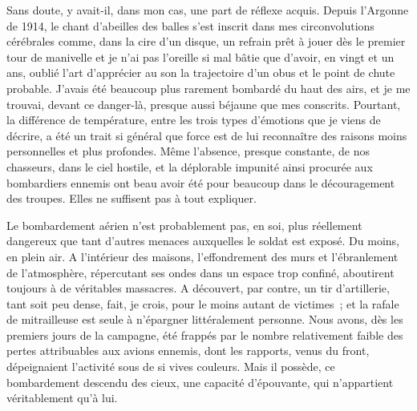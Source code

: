 \documentclass[french,twoside]{book} %
\begin{document}
Sans doute, y avait-il, dans mon cas, une part de réflexe acquis. Depuis l’Argonne de 1914, le chant d’abeilles des balles s’est inscrit dans mes circonvolutions cérébrales comme, dans la cire d’un disque, un refrain prêt à jouer dès le premier tour de manivelle et je n’ai pas l’oreille si mal bâtie que d’avoir, en vingt et un ans, oublié l’art d’apprécier au son la trajectoire d’un obus et le point de chute probable. J’avais été beaucoup plus rarement bombardé du haut des airs, et je me trouvai, devant ce danger-là, presque aussi béjaune que mes conscrits. Pourtant, la différence de température, entre les trois types d’émotions que je viens de décrire, a été un trait si général que force est de lui reconnaître des raisons moins personnelles et plus profondes. Même l’absence, presque constante, de nos chasseurs, dans le ciel hostile, et la déplorable impunité ainsi procurée aux bombardiers ennemis ont beau avoir été pour beaucoup dans le découragement des troupes. Elles ne suffisent pas à tout expliquer.\par
Le bombardement aérien n’est probablement pas, en soi, plus réellement dangereux que tant d’autres menaces auxquelles le soldat est exposé. Du moins, en plein air. A l’intérieur des maisons, l’effondrement des murs et l’ébranlement de l’atmosphère, répercutant ses ondes dans un espace trop confiné, aboutirent toujours à de véritables massacres. A découvert, par contre, un tir d’artillerie, tant soit peu dense, fait, je crois, pour le moins autant de victimes ; et la rafale de mitrailleuse est seule à n’épargner littéralement personne. Nous avons, dès les premiers jours de la campagne, été frappés par le nombre relativement faible des pertes attribuables aux avions ennemis, dont les rapports, venus du   front, dépeignaient l’activité sous de si vives couleurs. Mais il possède, ce bombardement descendu des cieux, une capacité d’épouvante, qui n’appartient véritablement qu’à lui.\par
\end{document}

